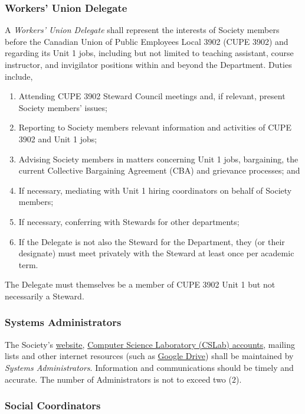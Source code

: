 \subsubsection{Workers’ Union Delegate}
A \textit{Workers' Union Delegate} shall represent the interests of Society
members before the Canadian Union of Public Employees Local 3902 (CUPE 3902)
and regarding its Unit 1 jobs, including but not limited to teaching assistant,
course instructor, and invigilator positions within and beyond the Department.
Duties include,
\begin{enumerate}
      \item Attending CUPE 3902 Steward Council meetings and, if relevant, present Society
            members' issues;
      \item Reporting to Society members relevant information and activities of CUPE 3902
            and Unit 1 jobs;
      \item Advising Society members in matters concerning Unit 1 jobs, bargaining, the
            current Collective Bargaining Agreement (CBA) and grievance processes; and
      \item If necessary, mediating with Unit 1 hiring coordinators on behalf of Society
            members;
      \item If necessary, conferring with Stewards for other departments;
      \item If the Delegate is not also the Steward for the Department, they (or their
            designate) must meet privately with the Steward at least once per academic
            term.
\end{enumerate}
The Delegate must themselves be a member of CUPE 3902 Unit 1 but not necessarily a Steward.

\subsubsection{Systems Administrators}\label{sec:administrators}

The Society's \href{https://www.cs.toronto.edu/csgsbs/}{website},
\href{https://support.cs.toronto.edu/}{Computer Science Laboratory (CSLab)
      accounts}, mailing lists and other internet resources (such as
\href{https://drive.google.com/}{Google Drive}) shall be maintained by
\textit{Systems Administrators}. Information and communications should be
timely and accurate. The number of Administrators is not to exceed two ($2$).

\subsubsection{Social Coordinators}\label{sec:coordinators}

